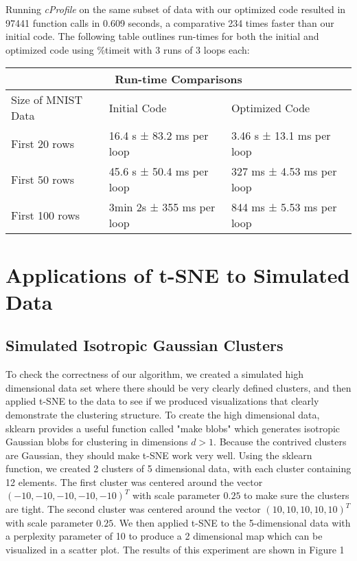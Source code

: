 \documentclass{article}
\begin{document}
Running \textit{cProfile} on the same subset of data with our optimized code resulted in 97441 function calls in 0.609 seconds, a comparative 234 times faster than our initial code. The following table outlines run-times for both the initial and optimized code using \%timeit with 3 runs of 3 loops each: \newline

\begin{center}
\begin{tabular}{ |p{4cm}||p{5cm}|p{5cm}|  }
 \hline
 \multicolumn{3}{|c|}{Run-time Comparisons} \\
 \hline
 Size of MNIST Data & Initial Code & Optimized Code \\
 \hline
 First 20 rows & 16.4 s ± 83.2 ms per loop & 
 3.46 s ± 13.1 ms per loop \\
 First 50 rows & 45.6 s ± 50.4 ms per loop & 
 327 ms ± 4.53 ms per loop \\
 First 100 rows & 3min 2s ± 355 ms per loop & 
 844 ms ± 5.53 ms per loop \\
 \hline
\end{tabular}
\end{center}

\section*{Applications of t-SNE to Simulated Data}

\subsection*{Simulated Isotropic Gaussian Clusters}

To check the correctness of our algorithm, we created a simulated high dimensional data set where there should be very clearly defined clusters, and then applied t-SNE to the data to see if we produced visualizations that clearly demonstrate the clustering structure. To create the high dimensional data, sklearn provides a useful function called "make blobs" which generates isotropic Gaussian blobs for clustering in dimensions $d > 1$. Because the contrived clusters are Gaussian, they should make t-SNE work very well.  Using the sklearn function, we created 2 clusters of 5 dimensional data, with each cluster containing 12 elements. The first cluster was centered around the vector $(-10, -10, -10, -10, -10)^T$ with scale parameter $0.25$ to make sure the clusters are tight. The second cluster was centered around the vector $(10, 10,  10, 10, 10)^T$ with scale parameter $0.25$. We then applied t-SNE to the 5-dimensional data with a perplexity parameter of 10 to produce a 2 dimensional map which can be visualized in a scatter plot. The results of this experiment are shown in Figure 1
\end{document}
